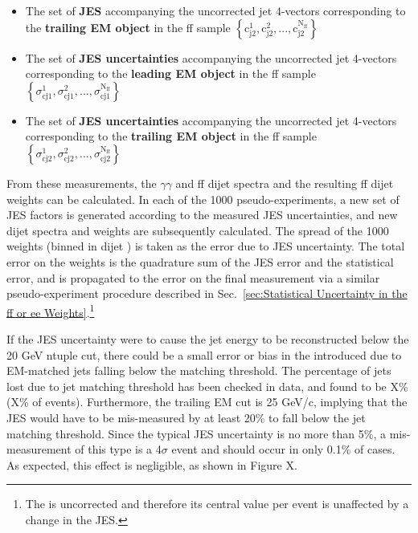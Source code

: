 \documentclass[dissertation.tex]{subfiles}
\begin{document}
\begin{itemize}
  \item The set of \textbf{JES} accompanying the uncorrected jet 4-vectors corresponding to the \textbf{trailing EM object} in the ff sample $\left\{\mbox{c}_{\mbox{j}2}^{1}, \mbox{c}_{\mbox{j}2}^{2},...,\mbox{c}_{\mbox{j}2}^{\mbox{N}_{\mbox{ff}}}\right\}$
  \item The set of \textbf{JES uncertainties} accompanying the uncorrected jet 4-vectors corresponding to the \textbf{leading EM object} in the ff sample $\left\{\sigma_{\mbox{cj}1}^{1}, \sigma_{\mbox{cj}1}^{2},...,\sigma_{\mbox{cj}1}^{\mbox{N}_{\mbox{ff}}}\right\}$
  \item The set of \textbf{JES uncertainties} accompanying the uncorrected jet 4-vectors corresponding to the \textbf{trailing EM object} in the ff sample $\left\{\sigma_{\mbox{cj}2}^{1}, \sigma_{\mbox{cj}2}^{2},...,\sigma_{\mbox{cj}2}^{\mbox{N}_{\mbox{ff}}}\right\}$
\end{itemize}
%
From these measurements, the $\gamma\gamma$ and ff dijet \pT spectra and the resulting ff dijet weights can be calculated.  In each of the 1000 pseudo-experiments, a new set of JES factors is generated according to the measured JES uncertainties, and new dijet \pT spectra and weights are subsequently calculated.  The spread of the 1000 weights (binned in dijet \pT) is taken as the error due to JES uncertainty.  The total error on the weights is the quadrature sum of the JES error and the statistical error, and is propagated to the error on the final \MET measurement via a similar pseudo-experiment procedure described in Sec.~\ref{sec:Statistical Uncertainty in the ff or ee Weights}.\footnote{The \MET is uncorrected and therefore its central value per event is unaffected by a change in the JES.}

If the JES uncertainty were to cause the jet energy to be reconstructed below the 20 GeV ntuple cut, there could be a small error or bias in the \MET introduced due to EM-matched jets falling below the matching threshold.  The percentage of jets lost due to jet \ET matching threshold has been checked in data, and found to be X\% (X\% of events).  Furthermore, the trailing EM \ET cut is 25 GeV/c, implying that the JES would have to be mis-measured by at least 20\% to fall below the jet matching threshold.  Since the typical JES uncertainty is no more than 5\%, a mis-measurement of this type is a 4$\sigma$ event and should occur in only 0.1\% of cases.  As expected, this effect is negligible, as shown in Figure X.

\end{document}
